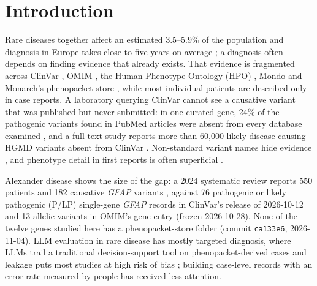\documentclass{article} %
\begin{document}
\section{Introduction}
\label{sec:intro}
Rare diseases together affect an estimated 3.5--5.9\% of the population \citep{Wakap2019EstimatingCumulative} and diagnosis in Europe takes close to five years on average \citep{Faye2024TimeDiagnosis}; a diagnosis often depends on finding evidence that already exists. That evidence is fragmented across ClinVar \citep{landrum2025_clinvar}, OMIM \citep{amberger2019_omim}, the Human Phenotype Ontology (HPO) \citep{gargano2024_hpo}, Mondo \citep{vasilevsky2025_mondo} and Monarch's phenopacket-store \citep{danis2025_phenopacket_store}, while most individual patients are described only in case reports. A laboratory querying ClinVar cannot see a causative variant that was published but never submitted: in one curated gene, 24\% of the pathogenic variants found in PubMed articles were absent from every database examined \citep{Lyons2023RareDisease}, and a full-text study reports more than 60,000 likely disease-causing HGMD variants absent from ClinVar \citep{birgmeier2020_avada}. Non-standard variant names hide evidence \citep{freeman2024_vv_literature,lansdon2026_nomenclature_errors}, and phenotype detail in first reports is often superficial \citep{almail2024_reporting_gaps}.

Alexander disease shows the size of the gap: a 2024 systematic review reports 550 patients and 182 causative \emph{GFAP} variants \citep{grossi2024_axd_meta}, against 76 pathogenic or likely pathogenic (P/LP) single-gene \emph{GFAP} records in ClinVar's release of 2026-10-12 and 13 allelic variants in OMIM's gene entry (frozen 2026-10-28). None of the twelve genes studied here has a phenopacket-store folder (commit \texttt{ca133e6}, 2026-11-04). LLM evaluation in rare disease has mostly targeted diagnosis, where LLMs trail a traditional decision-support tool on phenopacket-derived cases \citep{reese2026_llm_vs_exomiser} and leakage puts most studies at high risk of bias \citep{nguyen2026_llm_rd_metaanalysis}; building case-level records with an error rate measured by people has received less attention.
\end{document}

